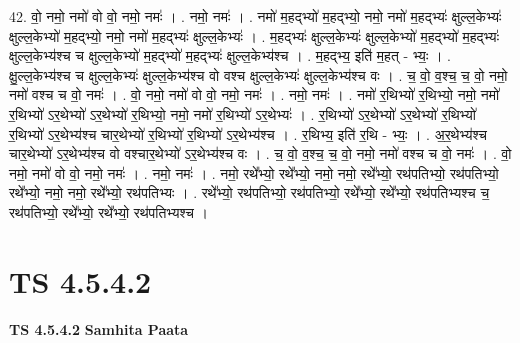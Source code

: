 \documentclass[17pt]{extarticle}
\begin{document}
42. वो॒ नमो॒ नमो॑ वो वो॒ नमो॒ नमः॑ । . नमो॒ नमः॑ । . नमो॑ म॒हद्भ्यो॑ म॒हद्भ्यो॒ नमो॒ नमो॑ म॒हद्भ्यः॑ क्षुल्ल॒केभ्यः॑ क्षुल्ल॒केभ्यो॑ म॒हद्भ्यो॒ नमो॒ नमो॑ म॒हद्भ्यः॑ क्षुल्ल॒केभ्यः॑ । . म॒हद्भ्यः॑ क्षुल्ल॒केभ्यः॑ क्षुल्ल॒केभ्यो॑ म॒हद्भ्यो॑ म॒हद्भ्यः॑ क्षुल्ल॒केभ्य॑श्च च क्षुल्ल॒केभ्यो॑ म॒हद्भ्यो॑ म॒हद्भ्यः॑ क्षुल्ल॒केभ्य॑श्च । . म॒हद्भ्य॒ इति॑ म॒हत् - भ्यः॒ । . क्षु॒ल्ल॒केभ्य॑श्च च क्षुल्ल॒केभ्यः॑ क्षुल्ल॒केभ्य॑श्च वो वश्च क्षुल्ल॒केभ्यः॑ क्षुल्ल॒केभ्य॑श्च वः । . च॒ वो॒ व॒श्च॒ च॒ वो॒ नमो॒ नमो॑ वश्च च वो॒ नमः॑ । . वो॒ नमो॒ नमो॑ वो वो॒ नमो॒ नमः॑ । . नमो॒ नमः॑ । . नमो॑ र॒थिभ्यो॑ र॒थिभ्यो॒ नमो॒ नमो॑ र॒थिभ्यो॑ ऽर॒थेभ्यो॑ ऽर॒थेभ्यो॑ र॒थिभ्यो॒ नमो॒ नमो॑ र॒थिभ्यो॑ ऽर॒थेभ्यः॑ । . र॒थिभ्यो॑ ऽर॒थेभ्यो॑ ऽर॒थेभ्यो॑ र॒थिभ्यो॑ र॒थिभ्यो॑ ऽर॒थेभ्य॑श्च चार॒थेभ्यो॑ र॒थिभ्यो॑ र॒थिभ्यो॑ ऽर॒थेभ्य॑श्च । . र॒थिभ्य॒ इति॑ र॒थि - भ्यः॒ । . अ॒र॒थेभ्य॑श्च चार॒थेभ्यो॑ ऽर॒थेभ्य॑श्च वो वश्चार॒थेभ्यो॑ ऽर॒थेभ्य॑श्च वः । . च॒ वो॒ व॒श्च॒ च॒ वो॒ नमो॒ नमो॑ वश्च च वो॒ नमः॑ । . वो॒ नमो॒ नमो॑ वो वो॒ नमो॒ नमः॑ । . नमो॒ नमः॑ । . नमो॒ रथे᳚भ्यो॒ रथे᳚भ्यो॒ नमो॒ नमो॒ रथे᳚भ्यो॒ रथ॑पतिभ्यो॒ रथ॑पतिभ्यो॒ रथे᳚भ्यो॒ नमो॒ नमो॒ रथे᳚भ्यो॒ रथ॑पतिभ्यः । . रथे᳚भ्यो॒ रथ॑पतिभ्यो॒ रथ॑पतिभ्यो॒ रथे᳚भ्यो॒ रथे᳚भ्यो॒ रथ॑पतिभ्यश्च च॒ रथ॑पतिभ्यो॒ रथे᳚भ्यो॒ रथे᳚भ्यो॒ रथ॑पतिभ्यश्च । \newline
\pagebreak
{}

\section{ TS 4.5.4.2 }

\textbf{TS 4.5.4.2 } \newline
\textbf{Samhita Paata} \newline
\end{document}
